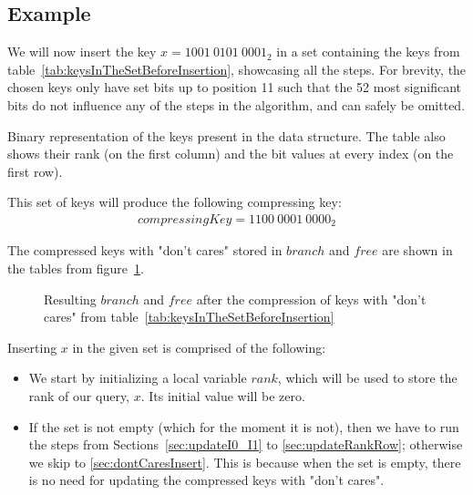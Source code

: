 \subsection{Example} \label{sec:dontCaresInsertExample}

We will now insert the key $x = 1001\ 0101\ 0001_2$ in a set containing the keys from table~\ref{tab:keysInTheSetBeforeInsertion}, showcasing all the steps. For brevity, the chosen keys only have set bits up to position 11 such that the 52 most significant bits do not influence any of the steps in the algorithm, and can safely be omitted.

\begin{table}[H]
\centering

\caption{Binary representation of the keys present in the data structure. The table also shows their rank (on the first column) and the bit values at every index (on the first row).}
\label{tab:keysInTheSetBeforeInsertion}
\end{table}

This set of keys will produce the following compressing key:
\begin{align*}
    compressingKey = 1100\ 0001\ 0000_2
\end{align*}

The compressed keys with "don't cares" stored in $branch$ and $free$ are shown in the tables from figure~\ref{fig:branchAndFreeBeforeInsertion}.

\begin{figure}[H]
\centering

\caption{Resulting $branch$ and $free$ after the compression of keys with "don't cares" from table~\ref{tab:keysInTheSetBeforeInsertion}}
\label{fig:branchAndFreeBeforeInsertion}
\end{figure}

Inserting $x$ in the given set is comprised of the following:

\begin{itemize}
    \item
    We start by initializing a local variable $rank$, which will be used to store the rank of our query, $x$. Its initial value will be zero.
    
    \item
    If the set is not empty (which for the moment it is not), then we have to run the steps from Sections~\ref{sec:updateI0_I1} to \ref{sec:updateRankRow}; otherwise we skip to \ref{sec:dontCaresInsert}. This is because when the set is empty, there is no need for updating the compressed keys with "don't cares".
\end{itemize}

